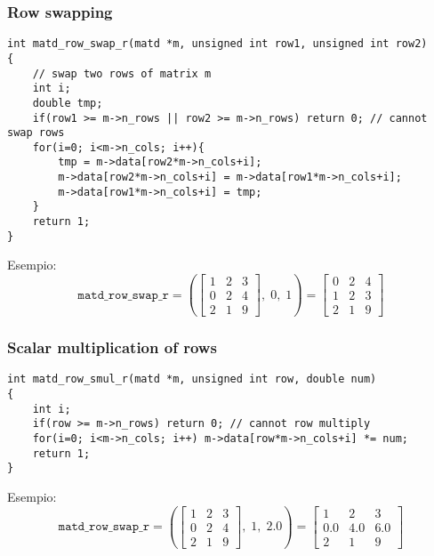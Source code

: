 \documentclass[10pt]{article}
\begin{document}
\subsubsection{Row swapping}

\begin{lstlisting}
int matd_row_swap_r(matd *m, unsigned int row1, unsigned int row2)
{
	// swap two rows of matrix m
	int i;
	double tmp;
	if(row1 >= m->n_rows || row2 >= m->n_rows) return 0; // cannot swap rows
	for(i=0; i<m->n_cols; i++){
		tmp = m->data[row2*m->n_cols+i];
		m->data[row2*m->n_cols+i] = m->data[row1*m->n_cols+i];
		m->data[row1*m->n_cols+i] = tmp;
	}
	return 1;
}
\end{lstlisting}

Esempio:
\begin{equation*}
\mathtt{matd\_row\_swap\_r} = \left( 
\begin{bmatrix}
1 & 2 & 3 \\ 0 & 2 & 4 \\ 2 & 1 & 9
\end{bmatrix}, \; 0, \; 1
\right) = 
\begin{bmatrix}
0 & 2 & 4 \\ 1 & 2 & 3 \\ 2 & 1 & 9
\end{bmatrix}
\end{equation*}

\subsubsection{Scalar multiplication of rows}

\begin{lstlisting}
int matd_row_smul_r(matd *m, unsigned int row, double num)
{
	int i;
	if(row >= m->n_rows) return 0; // cannot row multiply
	for(i=0; i<m->n_cols; i++) m->data[row*m->n_cols+i] *= num;
	return 1;
}
\end{lstlisting}

Esempio:
\begin{equation*}
\mathtt{matd\_row\_swap\_r} = \left( 
\begin{bmatrix}
1 & 2 & 3 \\ 0 & 2 & 4 \\ 2 & 1 & 9
\end{bmatrix}, \; 1, \; 2.0
\right) = 
\begin{bmatrix}
1 & 2 & 3 \\ 0.0 & 4.0 & 6.0 \\ 2 & 1 & 9
\end{bmatrix}
\end{equation*}
\end{document}
